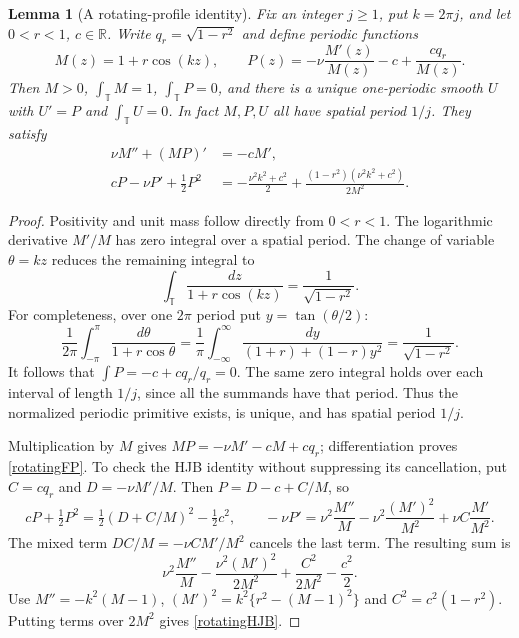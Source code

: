 \documentclass[11pt]{article}
\newtheorem{lemma}[theorem]{Lemma}
\newcommand{\R}{\mathbb R}
\newcommand{\T}{\mathbb T}
\begin{document}
\begin{lemma}[A rotating-profile identity]\label{rotatingidentity}
Fix an integer $j\geq1$, put $k=2\pi j$, and let $0<r<1$, $c\in\R$.
Write $q_r=\sqrt{1-r^2}$ and define periodic functions
\[
 M(z)=1+r\cos(kz),\qquad
 P(z)=-\nu\frac{M'(z)}{M(z)}-c+\frac{c q_r}{M(z)}.
\]
Then $M>0$, $\int_\T M=1$, $\int_\T P=0$, and there is a unique
one-periodic smooth $U$ with $U'=P$ and $\int_\T U=0$. In fact
$M,P,U$ all have spatial period $1/j$. They satisfy
\begin{align}
 \nu M''+(MP)'&=-cM',\label{rotatingFP}\\
 cP-\nu P'+\tfrac12P^2
 &=-\frac{\nu^2k^2+c^2}{2}
   +\frac{(1-r^2)(\nu^2k^2+c^2)}{2M^2}.\label{rotatingHJB}
\end{align}
\end{lemma}
\begin{proof}
Positivity and unit mass follow directly from $0<r<1$.
The logarithmic derivative $M'/M$ has zero integral over a spatial
period. The change of variable $\theta=kz$ reduces the remaining integral
to
\[
 \int_\T\frac{dz}{1+r\cos(kz)}=\frac1{\sqrt{1-r^2}}.
\]
For completeness, over one $2\pi$ period put $y=\tan(\theta/2)$:
\[
 \frac1{2\pi}\int_{-\pi}^{\pi}\frac{d\theta}{1+r\cos\theta}
 =\frac1\pi\int_{-\infty}^{\infty}
                  \frac{dy}{(1+r)+(1-r)y^2}
 =\frac1{\sqrt{1-r^2}}.
\]
It follows that $\int P=-c+cq_r/q_r=0$. The same zero integral holds
over each interval of length $1/j$, since all the summands have that
period. Thus the normalized periodic primitive exists, is unique, and
has spatial period $1/j$.

Multiplication by $M$ gives $MP=-\nu M'-cM+cq_r$;
differentiation proves \eqref{rotatingFP}. To check the HJB identity
without suppressing its cancellation, put $C=cq_r$ and
$D=-\nu M'/M$. Then $P=D-c+C/M$, so
\[
 cP+\tfrac12P^2=\tfrac12(D+C/M)^2-\tfrac12c^2,
 \qquad
 -\nu P'=\nu^2\frac{M''}{M}
           -\nu^2\frac{(M')^2}{M^2}
           +\nu C\frac{M'}{M^2}.
\]
The mixed term $DC/M=-\nu C M'/M^2$ cancels the last term.
The resulting sum is
\[
 \nu^2\frac{M''}{M}-\frac{\nu^2(M')^2}{2M^2}
                   +\frac{C^2}{2M^2}-\frac{c^2}{2}.
\]
Use $M''=-k^2(M-1)$,
$(M')^2=k^2\{r^2-(M-1)^2\}$ and $C^2=c^2(1-r^2)$.
Putting terms over $2M^2$ gives \eqref{rotatingHJB}.
\end{proof}
\end{document}
